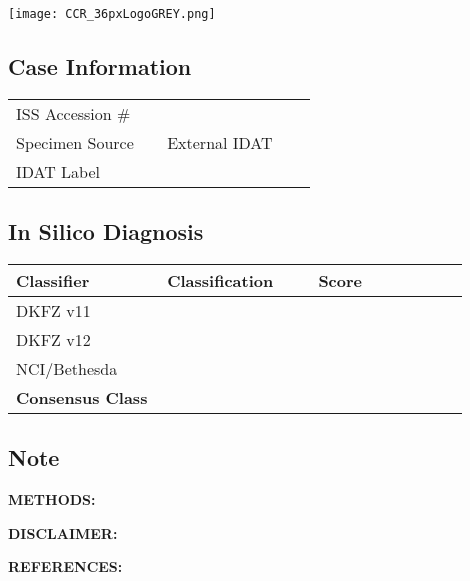\documentclass[
	letterpaper, %
	10pt, %
]{CSSullivanBusinessReport}
\begin{document}

\thispagestyle{empty} %

\vspace*{-0.075\textheight} %

\hspace*{-0.55cm}\texttt{[image: CCR\_36pxLogoGREY.png]} %

{\fontsize{18pt}{20pt}\selectfont\raggedright\textbf{\reporttitle}\par} %

{\textit{\textbf{\reportsubtitle}}\par} %

{\reportdate\par} %

\subsection*{Case Information}

\begin{tabular}{@{} L{0.3\linewidth} L{0.3\linewidth} @{}} %
	\toprule
	ISS Accession \# & \\
	Specimen Source & External IDAT\\
	IDAT Label & \\
	\bottomrule
\end{tabular}

\subsection*{In Silico Diagnosis}
\begin{tabular}{@{} L{0.3\linewidth} L{0.3\linewidth} L{0.3\linewidth} @{}} %
    {Classifier} & {Classification} & {Score}\\
	\toprule
	DKFZ v11 &  & \\
	DKFZ v12 &  & \\
	NCI/Bethesda &  & \\
	\textbf{Consensus Class} & \textbf{}\\
	\bottomrule
\end{tabular}

\par
\subsection*{Note}


{\footnotesize
\textbf{METHODS:} 

\textbf{DISCLAIMER:} 

\textbf{REFERENCES:}\\ 
}
\end{document}
